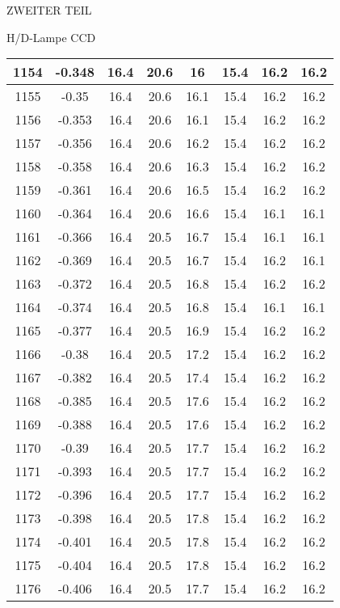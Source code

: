 \begin{appendix}
\begin{chapter}{ZWEITER TEIL}
\begin{section}{H/D-Lampe CCD}
\begin{scriptsize}
\begin{longtable}[htbp]{|c|c|c|c|c|c|c|c|}
            1154 & -0.348 & 16.4 & 20.6 & 16 & 15.4 & 16.2 & 16.2 \\ \hline
            1155 & -0.35 & 16.4 & 20.6 & 16.1 & 15.4 & 16.2 & 16.2 \\ \hline
            1156 & -0.353 & 16.4 & 20.6 & 16.1 & 15.4 & 16.2 & 16.2 \\ \hline
            1157 & -0.356 & 16.4 & 20.6 & 16.2 & 15.4 & 16.2 & 16.2 \\ \hline
            1158 & -0.358 & 16.4 & 20.6 & 16.3 & 15.4 & 16.2 & 16.2 \\ \hline
            1159 & -0.361 & 16.4 & 20.6 & 16.5 & 15.4 & 16.2 & 16.2 \\ \hline
            1160 & -0.364 & 16.4 & 20.6 & 16.6 & 15.4 & 16.1 & 16.1 \\ \hline
            1161 & -0.366 & 16.4 & 20.5 & 16.7 & 15.4 & 16.1 & 16.1 \\ \hline
            1162 & -0.369 & 16.4 & 20.5 & 16.7 & 15.4 & 16.2 & 16.1 \\ \hline
            1163 & -0.372 & 16.4 & 20.5 & 16.8 & 15.4 & 16.2 & 16.2 \\ \hline
            1164 & -0.374 & 16.4 & 20.5 & 16.8 & 15.4 & 16.1 & 16.1 \\ \hline
            1165 & -0.377 & 16.4 & 20.5 & 16.9 & 15.4 & 16.2 & 16.2 \\ \hline
            1166 & -0.38 & 16.4 & 20.5 & 17.2 & 15.4 & 16.2 & 16.2 \\ \hline
            1167 & -0.382 & 16.4 & 20.5 & 17.4 & 15.4 & 16.2 & 16.2 \\ \hline
            1168 & -0.385 & 16.4 & 20.5 & 17.6 & 15.4 & 16.2 & 16.2 \\ \hline
            1169 & -0.388 & 16.4 & 20.5 & 17.6 & 15.4 & 16.2 & 16.2 \\ \hline
            1170 & -0.39 & 16.4 & 20.5 & 17.7 & 15.4 & 16.2 & 16.2 \\ \hline
            1171 & -0.393 & 16.4 & 20.5 & 17.7 & 15.4 & 16.2 & 16.2 \\ \hline
            1172 & -0.396 & 16.4 & 20.5 & 17.7 & 15.4 & 16.2 & 16.2 \\ \hline
            1173 & -0.398 & 16.4 & 20.5 & 17.8 & 15.4 & 16.2 & 16.2 \\ \hline
            1174 & -0.401 & 16.4 & 20.5 & 17.8 & 15.4 & 16.2 & 16.2 \\ \hline
            1175 & -0.404 & 16.4 & 20.5 & 17.8 & 15.4 & 16.2 & 16.2 \\ \hline
            1176 & -0.406 & 16.4 & 20.5 & 17.7 & 15.4 & 16.2 & 16.2 \\ \hline

\end{longtable}
\end{scriptsize}
\end{section}
\end{chapter}
\end{appendix}
